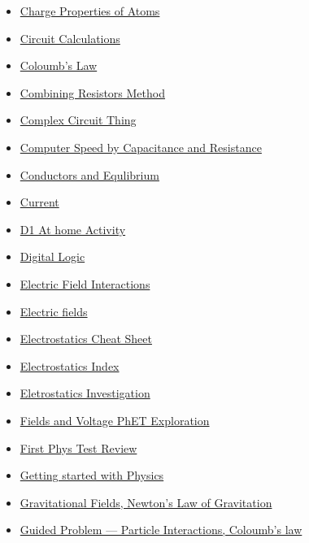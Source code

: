 \documentclass[11pt]{article}
\begin{document}
\begin{itemize}
\begin{itemize}
\begin{itemize}
\item \href{physics/modern\_physics/KBhPHYS201AtomChargeProps.org}{Charge Properties of Atoms}
\item \href{physics/modern\_physics/KBhPHYS201CircuitCalculations.org}{Circuit Calculations}
\item \href{physics/modern\_physics/KBhPHYS201ColoumbsLaw.org}{Coloumb's Law}
\item \href{physics/modern\_physics/KBhPHYS201CombiningResistors.org}{Combining Resistors Method}
\item \href{physics/modern\_physics/KBe20phys250retComplexCircuitTable1.org}{Complex Circuit Thing}
\item \href{physics/modern\_physics/KBe20phys250retCapacitanceResistanceQuestion.org}{Computer Speed by Capacitance and Resistance}
\item \href{physics/modern\_physics/KBhPHYS201ConductorsEquilibrium.org}{Conductors and Equlibrium}
\item \href{physics/modern\_physics/KBhPHYS201Current.org}{Current}
\item \href{physics/modern\_physics/KBhPHYS201D1AtHomeActivity.org}{D1 At home Activity}
\item \href{physics/modern\_physics/KBhPHYS201DigitalLogic.org}{Digital Logic}
\item \href{physics/modern\_physics/KBhPHYS201ElectricFieldInteractions.org}{Electric Field Interactions}
\item \href{physics/modern\_physics/KBhPHYS201ElectricFields.org}{Electric fields}
\item \href{physics/modern\_physics/KB20200825215200.org}{Electrostatics Cheat Sheet}
\item \href{physics/modern\_physics/KBhPHYS201IntroToElectrostaticsLN.org}{Electrostatics Index}
\item \href{physics/modern\_physics/KBxElectrostaticsInvestigation.org}{Eletrostatics Investigation}
\item \href{physics/modern\_physics/KBe20phys201retFieldsVoltagePhET.org}{Fields and Voltage PhET Exploration}
\item \href{physics/modern\_physics/KBxFirstPhysTestReview.org}{First Phys Test Review}
\item \href{physics/modern\_physics/KBhPHYS201GettingStarted.org}{Getting started with Physics}
\item \href{physics/modern\_physics/KBhPHYS201GravitationalFields.org}{Gravitational Fields, Newton's Law of Gravitation}
\item \href{physics/modern\_physics/KBhPHYS201GuidedProblemCoulomb.org}{Guided Problem --- Particle Interactions, Coloumb's law}

\end{itemize}
\end{itemize}
\end{itemize}
\end{document}
